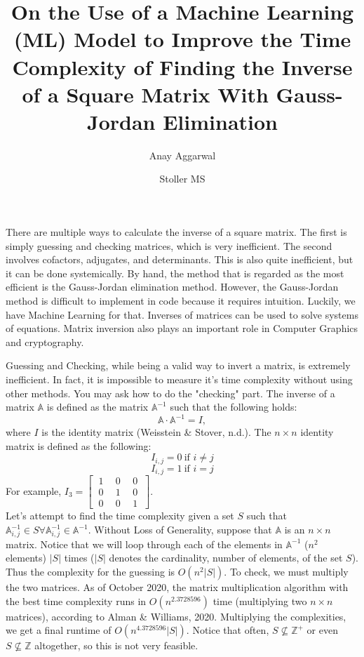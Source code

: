 \documentclass{article}
\title{On the Use of a Machine Learning (ML) Model to Improve the Time Complexity of Finding the Inverse of a Square Matrix With Gauss-Jordan Elimination}
\author{Anay Aggarwal}
\date{Stoller MS}
\begin{document}
\maketitle
\thispagestyle{fancy}
\newpage
There are multiple ways to calculate the inverse of a square matrix. The first is simply guessing and checking matrices, which is very inefficient. The second involves cofactors, adjugates, and determinants. This is also quite inefficient, but it can be done systemically. By hand, the method that is regarded as the most efficient is the Gauss-Jordan elimination method. However, the Gauss-Jordan method is difficult to implement in code because it requires intuition. Luckily, we have Machine Learning for that. Inverses of matrices can be used to solve systems of equations.  Matrix inversion also plays an important role in Computer Graphics and cryptography.

\par Guessing and Checking, while being a valid way to invert a matrix, is extremely inefficient. In fact, it is impossible to measure it's time complexity without using other methods. You may ask how to do the "checking" part. The inverse of a matrix $\mathbb{A}$ is defined as the  matrix $\mathbb{A}^{-1}$ such that the following holds:
$$\mathbb{A}\cdot \mathbb{A}^{-1}=I,$$
where $I$ is the identity matrix (Weisstein \& Stover, n.d.). The $n\times n$ identity matrix is defined as the following:
$$I_{i,j}=0~\text{if } i\ne j$$
$$I_{i,j}=1~\text{if } i = j$$
For example,
$I_3=\begin{bmatrix}~1~ & ~0~ & ~0~\\ ~0~ & ~1~ & ~0~\\ ~0~ & ~0~ & ~1~\end{bmatrix}$.
\\
Let's attempt to find the time complexity given a set $S$ such that $\mathbb{A}^{-1}_{i,j}\in S\forall \mathbb{A}^{-1}_{i,j}\in\mathbb{A}^{-1}$. Without Loss of Generality, suppose that $\mathbb{A}$ is an $n\times n$ matrix. Notice that we will loop through each of the elements in $\mathbb{A}^{-1}$ ($n^2$ elements) $|S|$ times ($|S|$ denotes the cardinality, number of elements, of the set $S$). Thus the complexity for the guessing is $O(n^2|S|)$. To check, we must multiply the two matrices. As of October 2020, the matrix multiplication algorithm with the best time complexity runs in $O(n^{2.3728596})$ time (multiplying two $n\times n$ matrices), according to Alman \& Williams, 2020. Multiplying the complexities, we get a final runtime of $O(n^{4.3728596}|S|)$. Notice that often, $S\not\subseteq \mathbb{Z}^{+}$ or even $S\not\subseteq \mathbb{Z}$ altogether, so this is not very feasible. 
\end{document}
